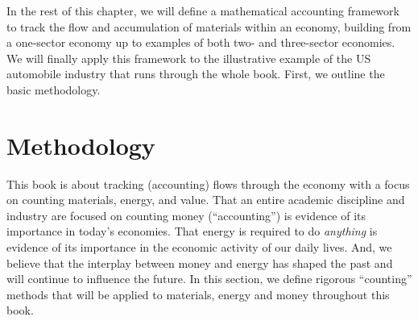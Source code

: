 In the rest of this chapter, we will define a mathematical accounting framework 
to track the flow and accumulation of
materials within an economy, 
building from a one-sector economy up to examples of both
two- and three-sector economies. 
We will finally apply this framework to the illustrative
example of the US automobile industry that runs through the whole book. 
First, we outline the basic methodology.

\section{Methodology}
\label{sec:Materials_Methodology}



This book is about tracking (accounting) flows through the 
economy with a focus on counting materials, energy, and value.
That an entire academic discipline and industry are focused on counting money (``accounting'')
is evidence of its importance in today's economies.
That energy is required to do \emph{anything} is evidence 
of its importance in the economic activity of our daily lives.
And, we believe that the interplay between money and energy
has shaped the past and will continue to influence the future.
In this section, we define rigorous ``counting'' methods that will be applied
to materials, energy and money throughout this book.


